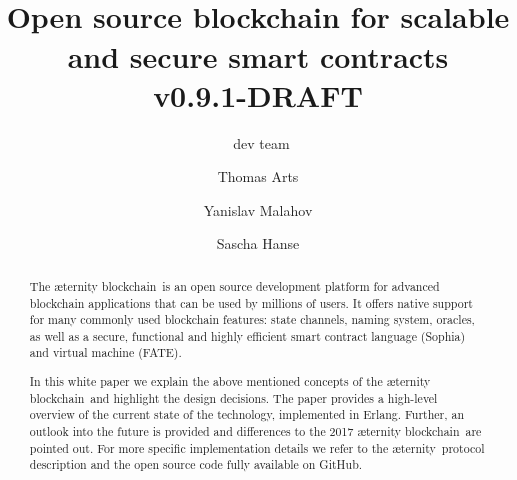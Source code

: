 \documentclass{article}
\title{\huge \Aet\  \\[0.5em] \large Open source blockchain for
scalable and secure smart contracts  \\[1em] v0.9.1-DRAFT }
\author{\aet\ dev team  \and Thomas Arts \and
             Yanislav Malahov \and Sascha Hanse}
\newcommand{\blockchain}{{\ae}ternity blockchain}
\newcommand{\aet}{{\ae}ternity}
\begin{document}
\maketitle


%
\begin{abstract}
The \blockchain\ is an open source development platform for advanced blockchain
applications that can be used by millions of users.
It offers native support for many commonly used
blockchain features: state channels, naming system, oracles, as well as a
secure, functional and highly efficient smart contract language (Sophia) and
virtual machine (FATE).

In this white paper we explain the above mentioned concepts of the
\blockchain\ and highlight the design decisions. The
paper provides a high-level overview of the current state of the
technology, implemented in Erlang. Further, an outlook into the future is provided and differences
to the 2017 \blockchain\ are pointed out. For more specific implementation
details we refer to the \aet\ protocol description
and the open source code fully available on GitHub.

\end{abstract}




\tableofcontents

\newpage








 
\end{document}
